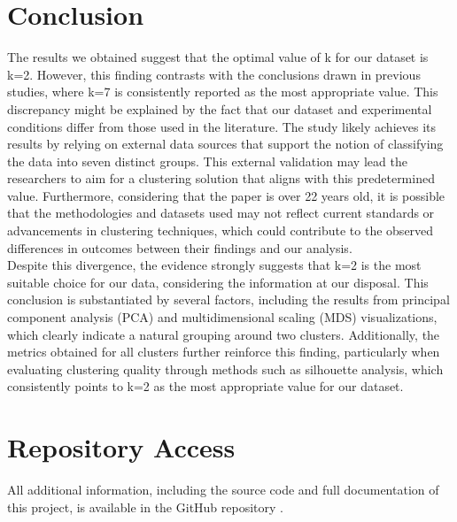 \documentclass{article}
\begin{document}
\section{Conclusion}
The results we obtained suggest that the optimal value of k for our dataset is k=2. However, this finding contrasts with the conclusions drawn in previous studies, where k=7 is consistently reported as the most appropriate value. This discrepancy might be explained by the fact that our dataset and experimental conditions differ from those used in the literature. 
The study likely achieves its results by relying on external data sources that support the notion of classifying the data into seven distinct groups. This external validation may lead the researchers to aim for a clustering solution that aligns with this predetermined value. Furthermore, considering that the paper is over 22 years old, it is possible that the methodologies and datasets used may not reflect current standards or advancements in clustering techniques, which could contribute to the observed differences in outcomes between their findings and our analysis.
\\

Despite this divergence, the evidence strongly suggests that k=2 is the most suitable choice for our data, considering the information at our disposal. This conclusion is substantiated by several factors, including the results from principal component analysis (PCA) and multidimensional scaling (MDS) visualizations, which clearly indicate a natural grouping around two clusters. Additionally, the metrics obtained for all clusters further reinforce this finding, particularly when evaluating clustering quality through methods such as silhouette analysis, which consistently points to k=2 as the most appropriate value for our dataset.


\section{Repository Access}

All additional information, including the source code and full documentation of this project, is available in the GitHub repository \cite{silva2024github}.


\end{document}
